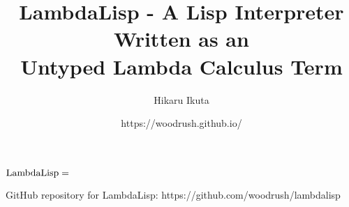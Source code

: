 \documentclass[article, 12pt]{article}
\title{LambdaLisp - A Lisp Interpreter Written as an \\ Untyped Lambda Calculus Term}
\author{Hikaru Ikuta}
\date{https://woodrush.github.io/}
\begin{document}
\maketitle
${\rm LambdaLisp} =$

\begin{thebibliography}{A99}
     GitHub repository for LambdaLisp: https://github.com/woodrush/lambdalisp
\end{thebibliography}
\end{document}
